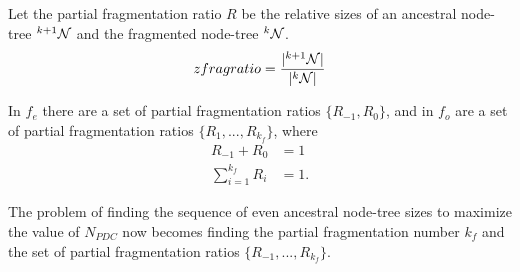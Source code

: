\begin{definition}\label{lem:fragratio}
  Let the partial fragmentation ratio $R$ be the relative sizes of an ancestral node-tree ${}^{k+1}\mathcal{N}$ and the fragmented node-tree ${}^{k}\mathcal{N}$.
  \begin{equation}\label{eq:fragratio}
    zfragratio = \frac{\abs{\pre{k+1}\nset}}{\abs{\pre{k}\nset}}
  \end{equation}
\end{definition}
In $f_e$ there are a set of partial fragmentation ratios $\{R_{-1}, R_0\}$, and in $f_o$ are a set of partial fragmentation ratios $\{R_1,...,R_{k_f}\}$, where
\begin{align}
  R_{-1} +  R_0         & = 1  \\
  \sum_{i=1}^{k_f}{R_i} & = 1.
\end{align}

The problem of finding the sequence of even ancestral node-tree sizes to maximize the value of $N_{PDC}$ now becomes finding the partial fragmentation number $k_f$ and the set of partial fragmentation ratios $\{R_{-1},..., R_{k_f}\}$.

